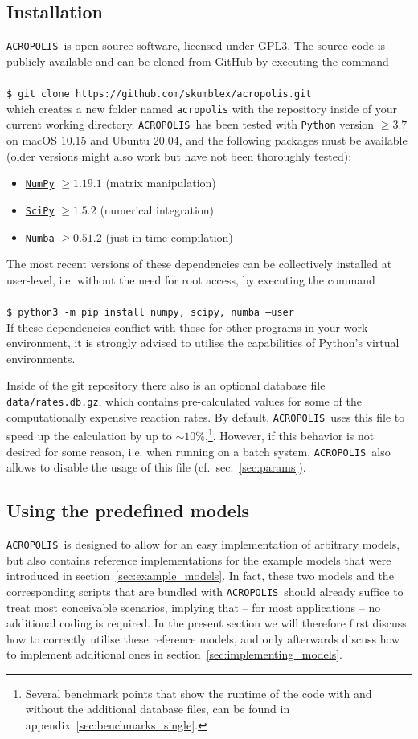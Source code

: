 \documentclass[11pt,a4paper]{article}
\newcommand{\cmd}[1]{\vspace{0.3cm}\texttt{\$ #1}\\[0.3cm]}
\newcommand{\acropolis}{\texttt{ACROPOLIS}~}
\begin{document}
\subsection{Installation}
\acropolis is open-source software, licensed under GPL3. The source code is publicly available and can be cloned from GitHub by executing the command\\\\
\cmd{git clone https://github.com/skumblex/acropolis.git}
which creates a new folder named \texttt{acropolis} with the repository inside of your current working directory.
\acropolis has been tested with \texttt{Python} version $\geq 3.7$ on macOS 10.15 and Ubuntu 20.04, and the following packages must be available (older versions might also work but have not been thoroughly tested):
\begin{itemize}
	\item \href{https://numpy.org/}{\texttt{NumPy}} $\geq 1.19.1$ (matrix manipulation)
	\item \href{https://www.scipy.org/}{\texttt{SciPy}} $\geq 1.5.2$ (numerical integration)
	\item \href{https://numba.pydata.org/}{\texttt{Numba}} $\geq 0.51.2$ (just-in-time compilation)
\end{itemize}
The most recent versions of these dependencies can be collectively installed at user-level, i.e. without the need for root access, by executing the command\\\\
\cmd{python3 -m pip install numpy, scipy, numba --user}
If these dependencies conflict with those for other programs in your work environment, it is strongly advised to utilise the capabilities of Python's virtual environments.

Inside of the git repository there also is an optional database file \texttt{data/rates.db.gz}, which contains pre-calculated values for some of the computationally expensive reaction rates. By default, \acropolis uses this file to speed up the calculation by up to $\sim 10\%$,\footnote{Several benchmark points that show the runtime of the code with and without the additional database files, can be found in appendix~\ref{sec:benchmarks_single}.}. However, if this behavior is not desired for some reason, i.e. when running on a batch system, \acropolis also allows to disable the usage of this file (cf.~sec.~\ref{sec:params}).


\subsection{Using the predefined models}
\acropolis is designed to allow for an easy implementation of arbitrary models, but also contains reference implementations for the example models that were introduced in section~\ref{sec:example_models}. In fact, these two models and the corresponding scripts that are bundled with \acropolis should already suffice to treat most conceivable scenarios, implying that -- for most applications -- no additional coding is required. In the present section we will therefore first discuss how to correctly utilise these reference models, and only afterwards discuss how to implement additional ones in section~\ref{sec:implementing_models}.
\end{document}
